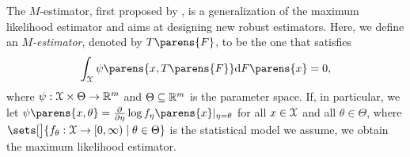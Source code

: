 \begin{example}[$M$-estimator]\label{example-inf-fun-m-estimator}
	The $M$-estimator, first proposed by \textcite{Huber1964-ph}, is a generalization of the maximum likelihood estimator and aims at designing new robust estimators. Here, we define an \textit{$M$-estimator}, denoted by $T \parens{F}$, to be the one that satisfies 
	\begin{align*}
		\int_{\calX} \psi \parens{x, T \parens{F}} \diff F \parens{x} = 0, 
	\end{align*}
	where $\psi: \mathcal{X} \times \Theta \to \mathbb{R}^m$ and $\Theta \subseteq \mathbb{R}^m$ is the parameter space. If, in particular, we let $\psi \parens{x, \theta} = \frac{\partial}{\partial \eta} \log f_{\eta} \parens{x}\vert_{\eta = \theta}$ for all $x \in \mathcal{X}$ and all $\theta \in \Theta$, where $\sets[\big]{f_{\theta}: \calX \to [0, \infty) \mid \theta \in \Theta}$ is the statistical model we assume, we obtain the maximum likelihood estimator. 
	

\end{example}

